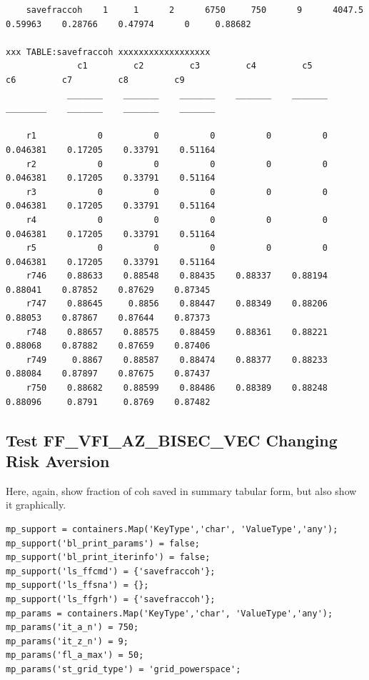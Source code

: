\documentclass[
]{book}
\begin{document}
\begin{verbatim}
    savefraccoh    1     1      2      6750     750      9      4047.5    0.59963    0.28766    0.47974      0     0.88682

xxx TABLE:savefraccoh xxxxxxxxxxxxxxxxxx
              c1         c2         c3         c4         c5          c6         c7         c8         c9   
            _______    _______    _______    _______    _______    ________    _______    _______    _______

    r1            0          0          0          0          0    0.046381    0.17205    0.33791    0.51164
    r2            0          0          0          0          0    0.046381    0.17205    0.33791    0.51164
    r3            0          0          0          0          0    0.046381    0.17205    0.33791    0.51164
    r4            0          0          0          0          0    0.046381    0.17205    0.33791    0.51164
    r5            0          0          0          0          0    0.046381    0.17205    0.33791    0.51164
    r746    0.88633    0.88548    0.88435    0.88337    0.88194     0.88041    0.87852    0.87629    0.87345
    r747    0.88645     0.8856    0.88447    0.88349    0.88206     0.88053    0.87867    0.87644    0.87373
    r748    0.88657    0.88575    0.88459    0.88361    0.88221     0.88068    0.87882    0.87659    0.87406
    r749     0.8867    0.88587    0.88474    0.88377    0.88233     0.88084    0.87897    0.87675    0.87437
    r750    0.88682    0.88599    0.88486    0.88389    0.88248     0.88096     0.8791     0.8769    0.87482
\end{verbatim}

\hypertarget{test-ff_vfi_az_bisec_vec-changing-risk-aversion}{%
\subsection{Test FF\_VFI\_AZ\_BISEC\_VEC Changing Risk Aversion}\label{test-ff_vfi_az_bisec_vec-changing-risk-aversion}}

Here, again, show fraction of coh saved in summary tabular form, but
also show it graphically.

\begin{verbatim}
mp_support = containers.Map('KeyType','char', 'ValueType','any');
mp_support('bl_print_params') = false;
mp_support('bl_print_iterinfo') = false;
mp_support('ls_ffcmd') = {'savefraccoh'};
mp_support('ls_ffsna') = {};
mp_support('ls_ffgrh') = {'savefraccoh'};
mp_params = containers.Map('KeyType','char', 'ValueType','any');
mp_params('it_a_n') = 750;
mp_params('it_z_n') = 9;
mp_params('fl_a_max') = 50;
mp_params('st_grid_type') = 'grid_powerspace';
\end{verbatim}
\end{document}
